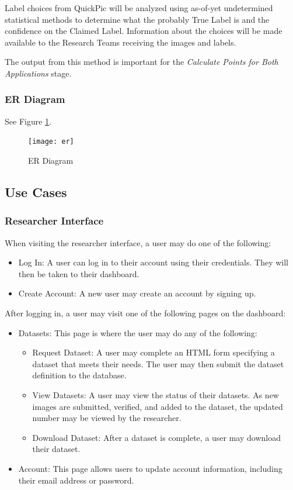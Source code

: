 \documentclass{article}
\begin{document}
Label choices from QuickPic will be analyzed using as-of-yet undetermined
statistical methods to determine what the probably True Label is and the
confidence on the Claimed Label.  Information about the choices will be made
available to the Research Teams receiving the images and labels.

The output from this method is important for the \textit{Calculate Points for
Both Applications} stage.

\subsubsection{ER Diagram}

See Figure \ref{er}.

\begin{figure}
  \centering
  \texttt{[image: er]}
  \caption{ER Diagram}
  \label{er}
\end{figure}

\subsection{Use Cases}
\subsubsection{Researcher Interface}
When visiting the researcher interface, a user may do one of the following:
\begin{itemize}
  \item Log In: A user can log in to their account using their credentials. They will then be taken to their dashboard.
  \item Create Account: A new user may create an account by signing up.
\end{itemize}

After logging in, a user may visit one of the following pages on the dashboard:
\begin{itemize}
  \item Datasets: This page is where the user may do any of the following:
    \begin{itemize}
      \item Request Dataset: A user may complete an HTML form specifying a
            dataset that meets their needs. The user may then submit the dataset definition
            to the database.
      \item View Datasets: A user may view the status of their datasets. As new
            images are submitted, verified, and added to the dataset, the updated number
            may be viewed by the researcher.
      \item Download Dataset: After a dataset is complete, a user may download their dataset.
    \end{itemize}
  \item Account: This page allows users to update account information,
        including their email address or password.

\end{itemize}
\end{document}
